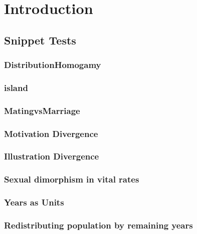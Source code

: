 \startthechapters 
 \chapter{Introduction}
 \label{chap:Intro}
 
 

 \section{Snippet Tests}
 
\subsection{DistributionHomogamy}
 
 

\subsection{island}
 
 

\subsection{MatingvsMarriage}
 
  

\subsection{Motivation Divergence} 
 
 

\subsection{Illustration Divergence} 
 
 
\subsection{Sexual dimorphism in vital rates} 
 

\subsection{Years as Units}



\subsection{Redistributing population by remaining years}



